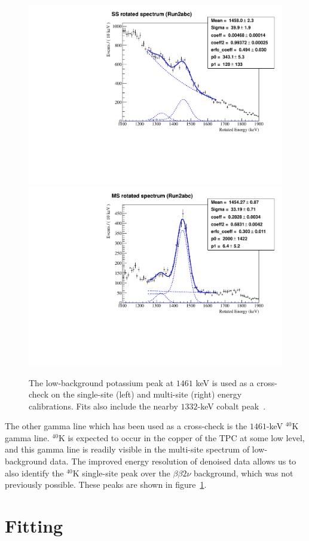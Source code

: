 \begin{figure}
\begin{center}
\includegraphics[keepaspectratio=true,width=.49\textwidth]{EXO_Workspace_Run2abc_K40_ss_1250keVto1650keV.pdf}
\includegraphics[keepaspectratio=true,width=.49\textwidth]{EXO_Workspace_Run2abc_K40_ms_1250keVto1650keV.pdf}
\end{center}
\renewcommand{\baselinestretch}{1}
\small\normalsize
\begin{quote}
\caption{The low-background potassium peak at $1461$ keV is used as a cross-check on the single-site (left) and multi-site (right) energy calibrations.  Fits also include the nearby $1332$-keV cobalt peak~\cite{EnergyDocumentRun2ab}.}
\label{fig:PotassiumPeakCheck}
\end{quote}
\end{figure}
\renewcommand{\baselinestretch}{2}
\small\normalsize

The other gamma line which has been used as a cross-check is the $1461$-keV $^{40}$K gamma line.  $^{40}$K is expected to occur in the copper of the TPC at some low level, and this gamma line is readily visible in the multi-site spectrum of low-background data.  The improved energy resolution of denoised data allows us to also identify the $^{40}$K single-site peak over the $\beta\beta 2\nu$ background, which was not previously possible.  These peaks are shown in figure~\ref{fig:PotassiumPeakCheck}.

\section{Fitting}\label{sec:ResultFitting}

